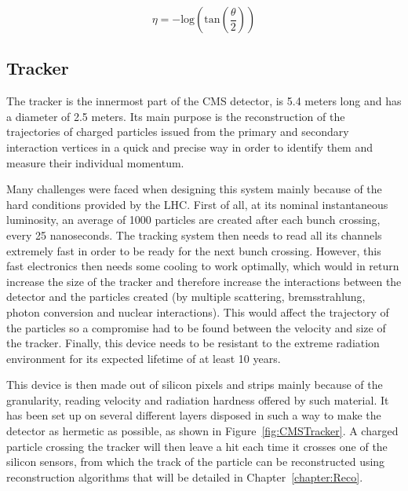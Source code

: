 \documentclass[a4paper, 10pt, openright]{report}
\begin{document}
\begin{equation}
\label{eq:Pseudorapidity}
\eta = - \text{log} \left (\text{tan} \left (\frac{\theta}{2} \right ) \right )
\end{equation}

\subsection{Tracker} \label{subsection:Tracker}

The tracker is the innermost part of the \ac{CMS} detector, is 5.4 meters long and has a diameter of 2.5 meters. Its main purpose is the reconstruction of the trajectories of charged particles issued from the primary and secondary interaction vertices in a quick and precise way in order to identify them and measure their individual momentum. 

Many challenges were faced when designing this system mainly because of the hard conditions provided by the \ac{LHC}. First of all, at its nominal instantaneous luminosity, an average of 1000 particles are created after each bunch crossing, every 25 nanoseconds. The tracking system then needs to read all its channels extremely fast in order to be ready for the next bunch crossing. However, this fast electronics then needs some cooling to work optimally, which would in return increase the size of the tracker and therefore increase the interactions between the detector and the particles created (by multiple scattering, bremsstrahlung, photon conversion and nuclear interactions). This would affect the trajectory of the particles so a compromise had to be found between the velocity and size of the tracker. Finally, this device needs to be resistant to the extreme radiation environment for its expected lifetime of at least 10 years.

This device is then made out of silicon pixels and strips mainly because of the granularity, reading velocity and radiation hardness offered by such material. It has been set up on several different layers disposed in such a way to make the detector as hermetic as possible, as shown in Figure~\ref{fig:CMSTracker}. A charged particle crossing the tracker will then leave a hit each time it crosses one of the silicon sensors, from which the track of the particle can be reconstructed using reconstruction algorithms that will be detailed in Chapter~\ref{chapter:Reco}.
\end{document}
